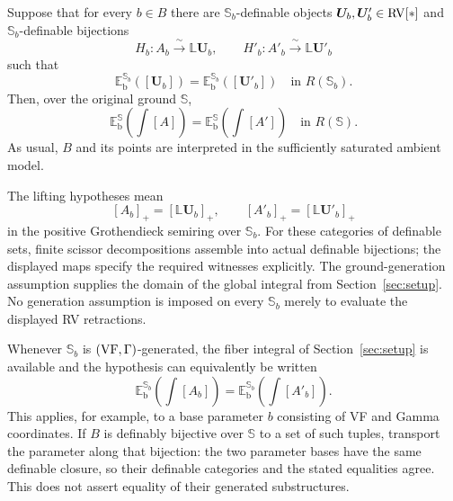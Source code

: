\begin{thm}\label{fubini}
Suppose that for every $b\in B$ there are
$\mathbb S_b$-definable objects
$\bm U_b,\bm U'_b\in\mathrm{RV}[*]$ and
$\mathbb S_b$-definable bijections
\[
 H_b:A_b\xrightarrow{\ \sim\ }\mathbb L\bm U_b,
 \qquad
 H'_b:A'_b\xrightarrow{\ \sim\ }\mathbb L\bm U'_b
\]
such that
\[
 \mathbb E_{\mathrm b}^{\mathbb S_b}([\bm U_b])
 =
 \mathbb E_{\mathrm b}^{\mathbb S_b}([\bm U'_b])
 \quad\text{in }R(\mathbb S_b).
\]
Then, over the original ground $\mathbb S$,
\[
 \mathbb E_{\mathrm b}^{\mathbb S}\!\left(\int[A]\right)
 =
 \mathbb E_{\mathrm b}^{\mathbb S}\!\left(\int[A']\right)
 \quad\text{in }R(\mathbb S).
\]
As usual, $B$ and its points are interpreted in the sufficiently
saturated ambient model.
\end{thm}

\begin{rem}
The lifting hypotheses mean
\[
 [A_b]_+=[\mathbb L\bm U_b]_+,\qquad
 [A'_b]_+=[\mathbb L\bm U'_b]_+
\]
in the positive Grothendieck semiring over $\mathbb S_b$.
For these categories of definable sets, finite scissor
decompositions assemble into actual definable bijections;
the displayed maps specify the required witnesses explicitly.
The ground-generation assumption supplies the domain of
the global integral from Section~\ref{sec:setup}.
No generation assumption is imposed on every $\mathbb S_b$
merely to evaluate the displayed RV retractions.



Whenever $\mathbb S_b$ is $(\mathrm{VF},\Gamma)$-generated, the fiber
integral of Section~\ref{sec:setup} is available and the hypothesis can
equivalently be written
\[
 \mathbb E_{\mathrm b}^{\mathbb S_b}
       \!\left(\int[A_b]\right)
 =
 \mathbb E_{\mathrm b}^{\mathbb S_b}
       \!\left(\int[A'_b]\right).
\]
This applies, for example, to a base parameter $b$ consisting
of VF and Gamma coordinates.
If $B$ is definably bijective over $\mathbb S$ to a set of such
tuples, transport the parameter along that bijection:
the two parameter bases have the same definable closure,
so their definable categories and the stated equalities agree.
This does not assert equality of their generated substructures.
\end{rem}

